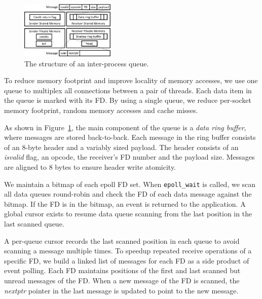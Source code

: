 \begin{figure}[t]
	\centering
	\includegraphics[width=0.4\textwidth]{images/locklessq_new}
	\vspace{-5pt}
	\caption{The structure of an inter-process queue.}
	\vspace{-15pt}
	\label{fig:locklessq-structure}
\end{figure}


To reduce memory footprint and improve locality of memory accesses, we use one queue to multiplex all connections between a pair of threads. Each data item in the queue is marked with its FD. By using a single queue, we reduce per-socket memory footprint, random memory accesses and cache misses.

As shown in Figure~\ref{fig:locklessq-structure}, the main component of the queue is a \emph{data ring buffer}, where messages are stored back-to-back.
Each message in the ring buffer consists of an 8-byte header and a variably sized payload. The header consists of an \textit{isvalid} flag, an opcode, the receiver's FD number and the payload size. Messages are aligned to 8 bytes to ensure header write atomicity.%

We maintain a bitmap of each epoll FD set.
When \texttt{epoll\_wait} is called, we scan all data queues round-robin and check the FD of each data message against the bitmap. If the FD is in the bitmap, an event is returned to the application.
A global cursor exists to resume data queue scanning from the last position in the last scanned queue.

A per-queue cursor records the last scanned position in each queue to avoid scanning a message multiple times.
To speedup repeated receive operations of a specific FD, we build a linked list of messages for each FD as a side product of event polling.
Each FD maintains positions of the first and last scanned but unread messages of the FD.
When a new message of the FD is scanned, the \emph{nextptr} pointer in the last message is updated to point to the new message.

